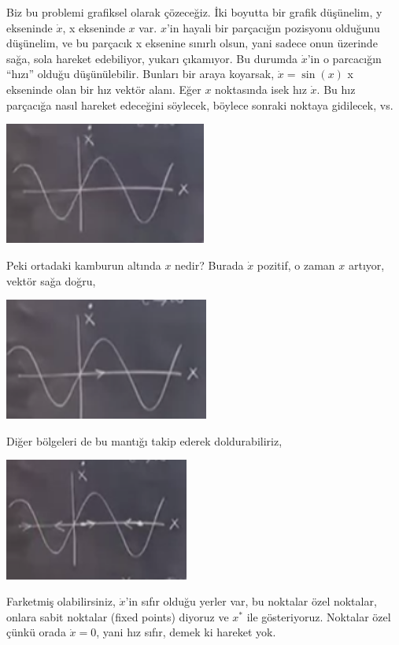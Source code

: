 \documentclass[12pt,fleqn]{article}\usepackage{../../common}
\begin{document}
Biz bu problemi grafiksel olarak çözeceğiz. İki boyutta bir grafik düşünelim, y
ekseninde $\dot{x}$, x ekseninde $x$ var. $x$'in hayali bir parçacığın pozisyonu
olduğunu düşünelim, ve bu parçacık x eksenine sınırlı olsun, yani sadece onun
üzerinde sağa, sola hareket edebiliyor, yukarı çıkamıyor. Bu durumda
$\dot{x}$'in o parcacığın ``hızı'' olduğu düşünülebilir. Bunları bir araya
koyarsak, $\dot{x} = \sin(x)$ x ekseninde olan bir hız vektör alanı. Eğer $x$
noktasında isek hız $\dot{x}$. Bu hız parçacığa nasıl hareket edeceğini
söylecek, böylece sonraki noktaya gidilecek, vs.

\includegraphics[height=4cm]{1_02.png}

Peki ortadaki kamburun altında $x$ nedir? Burada $\dot{x}$ pozitif, o zaman
$x$ artıyor, vektör sağa doğru, 

\includegraphics[height=4cm]{1_03.png}

Diğer bölgeleri de bu mantığı takip ederek doldurabiliriz, 

\includegraphics[height=4cm]{1_04.png}

Farketmiş olabilirsiniz, $\dot{x}$'in sıfır olduğu yerler var, bu noktalar
özel noktalar, onlara sabit noktalar (fixed points) diyoruz ve $x^\ast$ ile
gösteriyoruz. Noktalar özel çünkü orada $\dot{x}=0$, yani hız sıfır, demek
ki hareket yok. 
\end{document}
